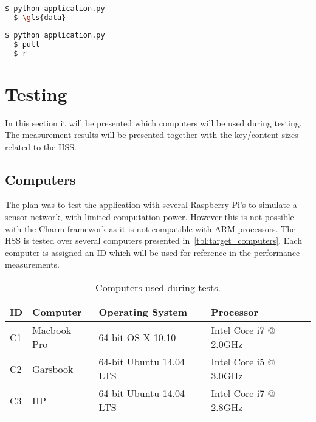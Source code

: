 \begin{lstlisting}[language=bash, caption={Start a device registering a prefix.}, label={lst:data}]
  $ python application.py
  $ \gls{data} 
\end{lstlisting}

\begin{lstlisting}[language=bash, caption={Start a device that will express \gls{interest} in \gls{data}.}, label={lst:pull}]
  $ python application.py
  $ pull
  $ r
\end{lstlisting}

\section{Testing}
In this section it will be presented which computers will be used during testing. 
The measurement results will be presented together with the key/content sizes related to the \gls{HSS}.

\subsection{Computers}
The plan was to test the application with several Raspberry Pi's to simulate a sensor network, with limited computation power.
However this is not possible with the Charm framework as it is not compatible with ARM processors.
The \gls{HSS} is tested over several computers presented in~\autoref{tbl:target_computers}.
Each computer is assigned an ID which will be used for reference in the performance measurements.

\begin{table}[h]
  \begin{tabular}{llll}
  ID      & Computer                  & Operating System          & Processor                    \\ \hline
  C1      & Macbook Pro               & 64-bit OS X 10.10         & Intel Core i7 @ 2.0GHz       \\ %
  C2      & Garsbook                  & 64-bit Ubuntu 14.04 LTS   & Intel Core i5 @ 3.0GHz       \\ %
  C3      & HP                        & 64-bit Ubuntu 14.04 LTS   & Intel Core i7 @ 2.8GHz       \\ %
  \end{tabular}
  \caption{Computers used during tests.}
  \label{tbl:target_computers}
\end{table}

